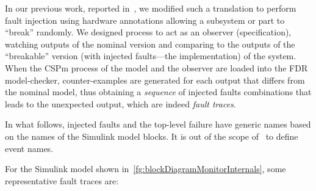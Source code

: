 \documentclass[12pt,openright,twoside,a4paper,oldfontcommands,english,brazil,draft]{abntex2}
\theoremstyle{theo}
\newcommand{\simulink}{Simulink\xspace}
\begin{document}
In our previous work, reported in~\cite{DM2012}, we modified such a translation to perform fault injection using hardware annotations allowing a subsystem or part to ``break'' randomly.
%
We designed  process to act as an observer (specification), watching outputs of the nominal version and comparing to the outputs of the ``breakable'' version (with injected faults---the implementation) of the system.
%
When the \ac{CSPm} process of the model and the observer are loaded into the \acs{FDR} model-checker, counter-examples are generated for each output that differs from the nominal model, thus obtaining a \emph{sequence} of injected faults combinations that leads to the unexpected output, which are indeed \emph{fault traces}.

In what follows, injected faults and the top-level failure have generic names based on the names of the \simulink model blocks.
It is out of the scope of~\cite{DM2012} to define event names.

For the \simulink model shown in~\cref{fg:blockDiagramMonitorInternals}, some representative fault traces are:
\end{document}
